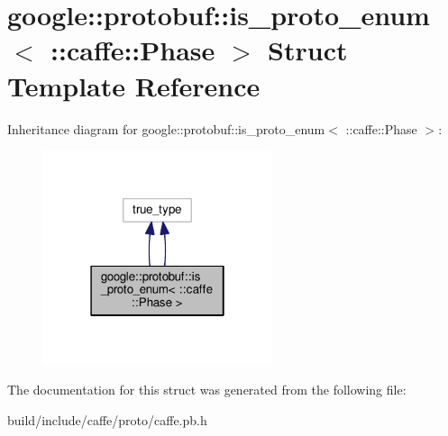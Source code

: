 \hypertarget{structgoogle_1_1protobuf_1_1is__proto__enum_3_01_1_1caffe_1_1_phase_01_4}{}\section{google\+:\+:protobuf\+:\+:is\+\_\+proto\+\_\+enum$<$ \+:\+:caffe\+:\+:Phase $>$ Struct Template Reference}
\label{structgoogle_1_1protobuf_1_1is__proto__enum_3_01_1_1caffe_1_1_phase_01_4}


Inheritance diagram for google\+:\+:protobuf\+:\+:is\+\_\+proto\+\_\+enum$<$ \+:\+:caffe\+:\+:Phase $>$\+:
\nopagebreak
\begin{figure}[H]
\begin{center}
\leavevmode
\includegraphics[width=190pt]{structgoogle_1_1protobuf_1_1is__proto__enum_3_01_1_1caffe_1_1_phase_01_4__inherit__graph}
\end{center}
\end{figure}


The documentation for this struct was generated from the following file\+:\begin{DoxyCompactItemize}
\item 
build/include/caffe/proto/caffe.\+pb.\+h\end{DoxyCompactItemize}
